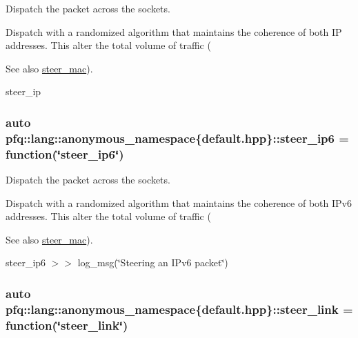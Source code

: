 Dispatch the packet across the sockets. 

Dispatch with a randomized algorithm that maintains the coherence of both IP addresses. This alter the total volume of traffic (\begin{DoxySeeAlso}{See also}
\hyperlink{namespacepfq_1_1lang_1_1anonymous__namespace_02default_8hpp_03_ad51e91e3b485c729ac1ba39a46e337a0}{steer\+\_\+mac}).
\end{DoxySeeAlso}
steer\+\_\+ip 
\subsubsection[{\texorpdfstring{steer\+\_\+ip6}{steer_ip6}}]{\setlength{\rightskip}{0pt plus 5cm}auto pfq\+::lang\+::anonymous\+\_\+namespace\{default.\+hpp\}\+::steer\+\_\+ip6 = {\bf function}(\char`\"{}steer\+\_\+ip6\char`\"{})}\hypertarget{namespacepfq_1_1lang_1_1anonymous__namespace_02default_8hpp_03_a02291b124a4aa900d78797e386517f69}{}\label{namespacepfq_1_1lang_1_1anonymous__namespace_02default_8hpp_03_a02291b124a4aa900d78797e386517f69}


Dispatch the packet across the sockets. 

Dispatch with a randomized algorithm that maintains the coherence of both I\+Pv6 addresses. This alter the total volume of traffic (\begin{DoxySeeAlso}{See also}
\hyperlink{namespacepfq_1_1lang_1_1anonymous__namespace_02default_8hpp_03_ad51e91e3b485c729ac1ba39a46e337a0}{steer\+\_\+mac}).
\end{DoxySeeAlso}
steer\+\_\+ip6 $>$$>$ log\+\_\+msg(\char`\"{}\+Steering an I\+Pv6 packet\char`\"{}) 
\subsubsection[{\texorpdfstring{steer\+\_\+link}{steer_link}}]{\setlength{\rightskip}{0pt plus 5cm}auto pfq\+::lang\+::anonymous\+\_\+namespace\{default.\+hpp\}\+::steer\+\_\+link = {\bf function}(\char`\"{}steer\+\_\+link\char`\"{})}\hypertarget{namespacepfq_1_1lang_1_1anonymous__namespace_02default_8hpp_03_ac1f3f9a2caf886a1441e62860a4ca058}{}\label{namespacepfq_1_1lang_1_1anonymous__namespace_02default_8hpp_03_ac1f3f9a2caf886a1441e62860a4ca058}


